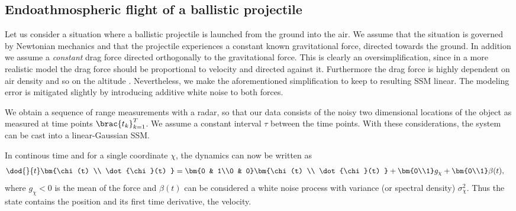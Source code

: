 

\subsection{Endoathmospheric flight of a ballistic projectile}\label{sec:ballistic}
Let us consider a situation where a ballistic projectile is launched
from the ground into the air. We assume that the situation is governed by Newtonian
mechanics and that the projectile experiences a constant known gravitational
force, directed towards the ground. In addition we assume a \emph{constant}
drag force directed orthogonally to the gravitational force. This is clearly
an oversimplification, since in a more realistic model the drag
force should be proportional to velocity and directed against it. Furthermore
the drag force is highly dependent on air density and so on the altitude \parencite{ristic2004beyond}.
Nevertheless, we make the aforementioned simplification to keep to resulting
SSM linear. The modeling error is mitigated slightly by introducing
additive white noise to both forces.

We obtain a sequence of range measurements with a radar,
so that our data consists of the noisy two dimensional locations 
of the object as measured at time points $\brac{t_k}_{k=1}^T$.
We assume a constant interval $\tau$ between the time points. With these 
considerations, the system can be cast into a linear-Gaussian SSM. 

In continous time and for a single coordinate $\chi$, 
the dynamics can now be written as
\begin{align}
	\dod{}{t}\bm{\chi(t) \\ \dot{\chi}(t) } &= 
	\bm{0 & 1\\0 & 0}\bm{\chi(t) \\ \dot{\chi}(t) } + \bm{0\\1}g_\chi + \bm{0\\1}\beta(t),
	\label{eq:ct_linear}
\end{align}
where $g_\chi<0$ is the mean of the force and $\beta(t)$ can be considered
a white noise process with variance (or spectral density) $\sigma^2_\chi$. 
Thus the state contains the position and its first time derivative, the velocity. 


